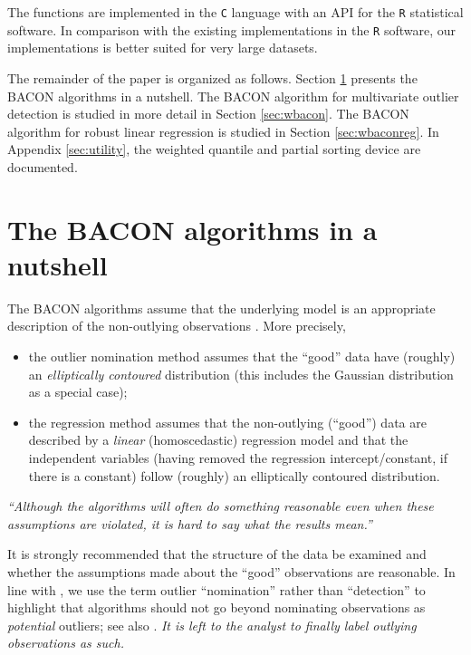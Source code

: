 \documentclass[a4paper,oneside,11pt,DIV=12]{scrartcl}
\newcommand{\code}[1]{{\texttt{#1}}}
\begin{document}
The functions are implemented in the \code{C} language with an API
for the \code{R} statistical software. In comparison with the existing
implementations in the \code{R} software, our implementations is better
suited for very large datasets.

The remainder of the paper is organized as follows. Section \ref{sec:nutshell}
presents the BACON algorithms in a nutshell. The BACON algorithm for
multivariate outlier detection is studied in more detail in Section
\ref{sec:wbacon}. The BACON algorithm for robust linear regression is studied
in Section \ref{sec:wbaconreg}. In Appendix \ref{sec:utility}, the weighted
quantile and partial sorting device are documented.

\section{The BACON algorithms in a nutshell}\label{sec:nutshell}
The BACON algorithms assume that the underlying model is an appropriate
description of the non-outlying observations \citep{billor_hadi_etal_2000}.
More precisely,

\begin{itemize}
    \item the outlier nomination method assumes that the ``good'' data have
        (roughly) an \emph{elliptically contoured} distribution (this includes
        the Gaussian distribution as a special case);
    \item the regression method assumes that the non-outlying (``good'')
        data are described by a \emph{linear} (homoscedastic) regression model
        and that the independent variables (having removed the regression
        intercept/constant, if there is a constant) follow (roughly) an
        elliptically contoured distribution.
\end{itemize}

\vspace{0.5em}

\noindent \emph{``Although the algorithms will often do something reasonable
even when these assumptions are violated, it is hard to say what the
results mean.''} \citep[][p. 290]{billor_hadi_etal_2000}

\vspace{1em}

It is strongly recommended that the structure of the data be examined
and whether the assumptions made about the ``good'' observations are
reasonable.  In line with \citet[][p. 290]{billor_hadi_etal_2000}, we use
the term outlier ``nomination'' rather than ``detection'' to highlight that
algorithms should not go beyond nominating observations as \emph{potential}
outliers; see also \citet{beguin_hulliger_2008}. \emph{It is left to the
analyst to finally label outlying observations as such.}
\end{document}
